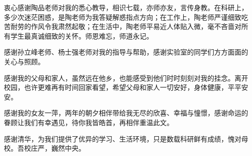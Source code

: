 \begin{ack}

衷心感谢陶品老师对我的悉心教导，相识七载，亦师亦友，言传身教。在科研上，多少次迷茫困惑，是陶老师为我答疑解惑指点方向；在工作上，陶老师严谨细致吃苦耐劳的作风令我肃然起敬；在生活中，陶老师平易近人体贴入微，毫不吝啬对所有学生最真诚细致的关怀。师恩难忘，师道永记。

感谢孙立峰老师、杨士强老师对我的指导与帮助，感谢实验室的同学们方方面面的关心与照顾。

感谢我的父母和家人，虽然远在他乡，也能感受到他们时时刻刻对我的挂念。离开校园，也许更难再有时间回家看望，希望父母和家人一切安好，身体健康，平平安安。

感谢我的女友一萍，两年的朝夕相伴带给我无尽的欣喜、幸福与憧憬，感谢命运的眷顾让我们有幸遇见，待你我皆皓首，再相伴重温此文。

感谢清华，为我们提供了优异的学习、生活环境，只是数载科研鲜有成绩，愧对母校。吾校庄严，巍然中央。

\end{ack}
